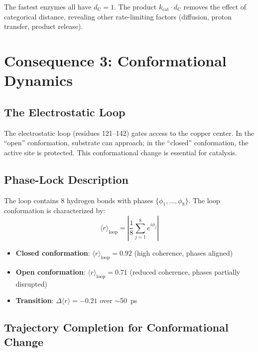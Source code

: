 \documentclass[twocolumn,aps,prx,superscriptaddress,longbibliography]{revtex4-2}
\theoremstyle{remark}
\newcommand{\kcat}{k_\text{cat}}
\newcommand{\dC}{d_\text{C}}
\newcommand{\orderpar}{\langle r \rangle}
\begin{document}
The fastest enzymes all have $\dC = 1$. The product $\kcat \cdot \dC$
removes the effect of categorical distance, revealing other rate-limiting
factors (diffusion, proton transfer, product release).

\section{Consequence 3: Conformational Dynamics}
\label{sec:conformational}

\subsection{The Electrostatic Loop}

The electrostatic loop (residues 121--142) gates access to the copper
center. In the ``open'' conformation, substrate can approach; in the
``closed'' conformation, the active site is protected. This conformational
change is essential for catalysis.

\subsection{Phase-Lock Description}

The loop contains 8 hydrogen bonds with phases $\{\phi_1, \ldots, \phi_8\}$.
The loop conformation is characterized by:
\begin{equation}
\orderpar_\text{loop} = \left| \frac{1}{8} \sum_{j=1}^{8} e^{i\phi_j} \right|
\label{eq:loop_order}
\end{equation}

\begin{itemize}
    \item \textbf{Closed conformation}: $\orderpar_\text{loop} = 0.92$
    (high coherence, phases aligned)

    \item \textbf{Open conformation}: $\orderpar_\text{loop} = 0.71$
    (reduced coherence, phases partially disrupted)

    \item \textbf{Transition}: $\Delta\orderpar = -0.21$ over $\sim$50~ps
\end{itemize}

\subsection{Trajectory Completion for Conformational Change}
\end{document}
